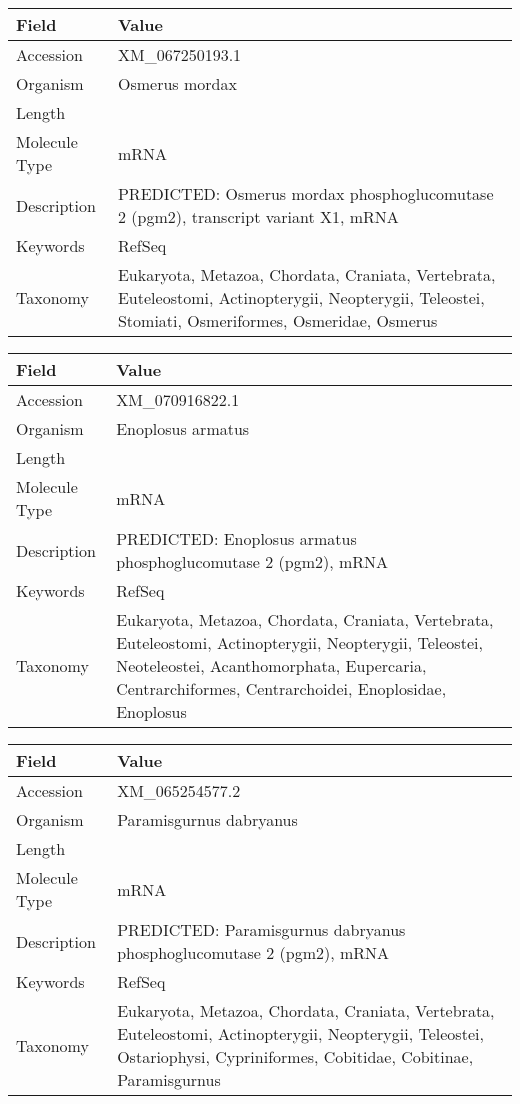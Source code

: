 \documentclass[10pt]{article}
\begin{document}
\vspace{1em}
{\footnotesize
\begin{longtable}{>{\raggedright\arraybackslash}p{4.5cm} >{\raggedright\arraybackslash}p{11.5cm}}
\textbf{Field} & \textbf{Value} \\
\hline
Accession & XM\_067250193.1 \\
Organism & Osmerus mordax \\
Length & 2478 \\
Molecule Type & mRNA \\
Description & PREDICTED: Osmerus mordax phosphoglucomutase 2 (pgm2), transcript variant X1, mRNA \\
Keywords & RefSeq \\
Taxonomy & Eukaryota, Metazoa, Chordata, Craniata, Vertebrata, Euteleostomi, Actinopterygii, Neopterygii, Teleostei, Stomiati, Osmeriformes, Osmeridae, Osmerus \\
\end{longtable}
}

\vspace{1em}
{\footnotesize
\begin{longtable}{>{\raggedright\arraybackslash}p{4.5cm} >{\raggedright\arraybackslash}p{11.5cm}}
\textbf{Field} & \textbf{Value} \\
\hline
Accession & XM\_070916822.1 \\
Organism & Enoplosus armatus \\
Length & 2825 \\
Molecule Type & mRNA \\
Description & PREDICTED: Enoplosus armatus phosphoglucomutase 2 (pgm2), mRNA \\
Keywords & RefSeq \\
Taxonomy & Eukaryota, Metazoa, Chordata, Craniata, Vertebrata, Euteleostomi, Actinopterygii, Neopterygii, Teleostei, Neoteleostei, Acanthomorphata, Eupercaria, Centrarchiformes, Centrarchoidei, Enoplosidae, Enoplosus \\
\end{longtable}
}

\vspace{1em}
{\footnotesize
\begin{longtable}{>{\raggedright\arraybackslash}p{4.5cm} >{\raggedright\arraybackslash}p{11.5cm}}
\textbf{Field} & \textbf{Value} \\
\hline
Accession & XM\_065254577.2 \\
Organism & Paramisgurnus dabryanus \\
Length & 2299 \\
Molecule Type & mRNA \\
Description & PREDICTED: Paramisgurnus dabryanus phosphoglucomutase 2 (pgm2), mRNA \\
Keywords & RefSeq \\
Taxonomy & Eukaryota, Metazoa, Chordata, Craniata, Vertebrata, Euteleostomi, Actinopterygii, Neopterygii, Teleostei, Ostariophysi, Cypriniformes, Cobitidae, Cobitinae, Paramisgurnus \\
\end{longtable}
}
\end{document}
